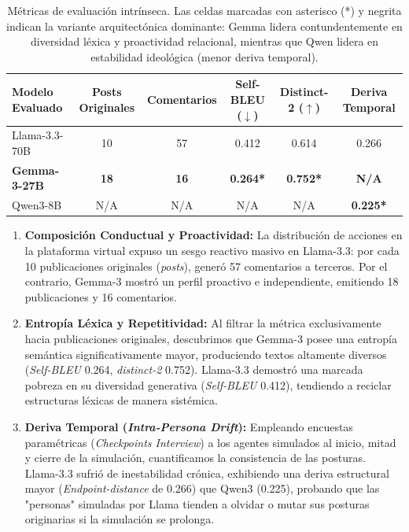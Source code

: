 ﻿\documentclass{article}
\begin{document}
\begin{table}[H]
    \centering
    \begin{tabular}{@{}lccccc@{}}
        \toprule
        \textbf{Modelo Evaluado} & \textbf{Posts Originales} & \textbf{Comentarios} & \textbf{Self-BLEU ($\downarrow$)} & \textbf{Distinct-2 ($\uparrow$)} & \textbf{Deriva Temporal} \\ \midrule
        Llama-3.3-70B & 10 & 57 & 0.412 & 0.614 & 0.266 \\
        \textbf{Gemma-3-27B} & \textbf{18} & \textbf{16} & \textbf{0.264*} & \textbf{0.752*} & \textbf{N/A} \\
        Qwen3-8B & N/A & N/A & N/A & N/A & \textbf{0.225*} \\ \bottomrule
    \end{tabular}
    \caption{Métricas de evaluación intrínseca. Las celdas marcadas con asterisco (*) y negrita indican la variante arquitectónica dominante: Gemma lidera contundentemente en diversidad léxica y proactividad relacional, mientras que Qwen lidera en estabilidad ideológica (menor deriva temporal).}
    \label{tab:analisis_intrinseco}
\end{table}

\begin{enumerate}
    \item \textbf{Composición Conductual y Proactividad:} La distribución de acciones en la plataforma virtual expuso un sesgo reactivo masivo en Llama-3.3: por cada 10 publicaciones originales (\textit{posts}), generó 57 comentarios a terceros. Por el contrario, Gemma-3 mostró un perfil proactivo e independiente, emitiendo 18 publicaciones y 16 comentarios.
    \item \textbf{Entropía Léxica y Repetitividad:} Al filtrar la métrica exclusivamente hacia publicaciones originales, descubrimos que Gemma-3 posee una entropía semántica significativamente mayor, produciendo textos altamente diversos (\textit{Self-BLEU} 0.264, \textit{distinct-2} 0.752). Llama-3.3 demostró una marcada pobreza en su diversidad generativa (\textit{Self-BLEU} 0.412), tendiendo a reciclar estructuras léxicas de manera sistémica.
    \item \textbf{Deriva Temporal (\textit{Intra-Persona Drift}):} Empleando encuestas paramétricas (\textit{Checkpoints Interview}) a los agentes simulados al inicio, mitad y cierre de la simulación, cuantificamos la consistencia de las posturas. Llama-3.3 sufrió de inestabilidad crónica, exhibiendo una deriva estructural mayor (\textit{Endpoint-distance} de 0.266) que Qwen3 (0.225), probando que las "personas" simuladas por Llama tienden a olvidar o mutar sus posturas originarias si la simulación se prolonga.
\end{enumerate}
\end{document}
